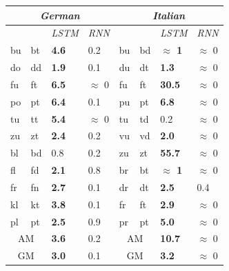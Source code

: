 \begin{table}[t]
  \begin{center}
	  \begin{tabular}{p{0.2cm}p{0.2cm}|p{0.6cm}p{0.6cm}||p{0.2cm}p{0.2cm}|p{0.99cm}p{0.8cm}}
	    \multicolumn{4}{c||}{\emph{German}}   &       \multicolumn{4}{c}{\emph{Italian}}\\      \hline
	    \multicolumn{2}{c}{\emph{}}&\emph{LSTM}&\emph{RNN} & \multicolumn{2}{c}{\emph{}}&  \emph{LSTM}&\emph{RNN}\\      \hline
                     bu &  bt &  \textbf{ 4.6} &  0.2             &  bu & bd & \textbf{ $\approx$ 1} & $\approx$ 0 \\            
                     do &  dd &  \textbf{ 1.9} &  0.1             &  du & dt & \textbf{ 1.3} & $\approx$ 0 \\             
                     fu &  ft &  \textbf{ 6.5} &  $\approx$ 0             &  fu & ft & \textbf{ 30.5} & $\approx$ 0 \\             
                     po &  pt &  \textbf{ 6.4} &  0.1             &  pu & pt & \textbf{ 6.8} & $\approx$ 0 \\             
                     tu &  tt &  \textbf{ 5.4} &  $\approx$ 0             &  tu & td &  0.2 & $\approx$ 0 \\                       
		     zu &  zt &  \textbf{ 2.4} &  0.2             &  vu & vd & \textbf{ 2.0} & $\approx$ 0 \\              \cline{1-4}
                     bl &  bd &   0.8          & 0.2              &  zu & zt & \textbf{ 55.7} & $\approx$ 0 \\              \cline{5-8} 
                     fl &  fd &  \textbf{ 2.1} & 0.8              &  br & bt & \textbf{ $\approx$ 1}  &  $\approx$ 0           \\ 
                     fr &  fn &  \textbf{ 2.7} & 0.1              &  dr & dt & \textbf{ 2.5} & 0.4 \\               
                     kl &  kt &  \textbf{ 3.8} & 0.1              &  fr & ft & \textbf{ 2.9} & $\approx$ 0 \\             
                     pl &  pt &  \textbf{ 2.5} & 0.9              &  pr & pt & \textbf{ 5.0} & $\approx$ 0 \\              \hline
	    \multicolumn{2}{c|}{AM}      & \textbf{3.6} & 0.2     & 	    \multicolumn{2}{c|}{AM}   & \textbf{10.7}  & $\approx$ 0         \\
	    \multicolumn{2}{c|}{GM} & \textbf{3.0} & 0.1          & 	    \multicolumn{2}{c|}{GM}   & \textbf{3.2} & $\approx$ 0           \\



\end{tabular}
\end{center}
\end{table}
